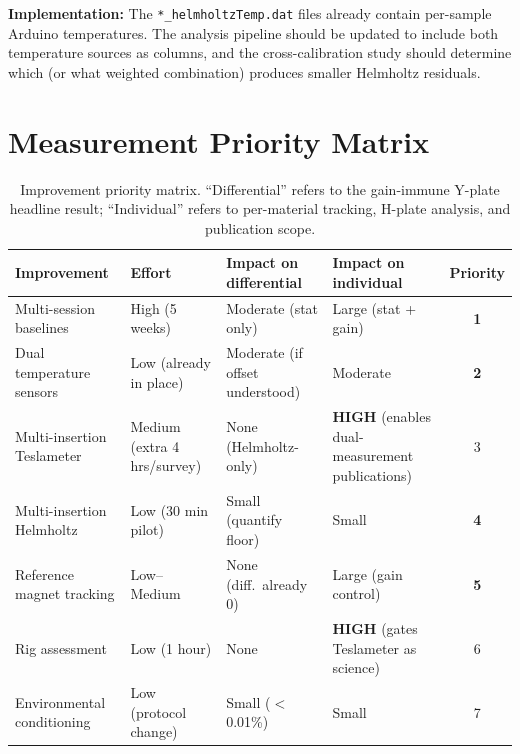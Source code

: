 \documentclass[11pt,letterpaper]{article}
\begin{document}
\textbf{Implementation:} The \texttt{*\_helmholtzTemp.dat} files already contain
per-sample Arduino temperatures. The analysis pipeline should be updated to
include both temperature sources as columns, and the cross-calibration study
should determine which (or what weighted combination) produces smaller Helmholtz
residuals.


\section{Measurement Priority Matrix}
\label{sec:priority-matrix}

\begin{table}[htbp]
\centering
\caption{Improvement priority matrix. ``Differential'' refers to the gain-immune
  Y-plate headline result; ``Individual'' refers to per-material tracking,
  H-plate analysis, and publication scope.}
\label{tab:priority}
\small
\begin{tabular}{@{}p{3.2cm}lp{2.5cm}p{2.5cm}c@{}}
\toprule
Improvement & Effort & Impact on differential & Impact on individual & Priority \\
\midrule
Multi-session baselines      & High (5 weeks)         & Moderate (stat only)      & Large (stat + gain)                                  & \textbf{1} \\
Dual temperature sensors     & Low (already in place)  & Moderate (if offset understood) & Moderate                                      & \textbf{2} \\
Multi-insertion Teslameter   & Medium (extra 4 hrs/survey) & None (Helmholtz-only) & \textbf{HIGH} (enables dual-measurement publications) & 3 \\
Multi-insertion Helmholtz    & Low (30 min pilot)      & Small (quantify floor)    & Small                                                & \textbf{4} \\
Reference magnet tracking    & Low--Medium              & None (diff.\ already 0)  & Large (gain control)                                 & \textbf{5} \\
Rig assessment               & Low (1 hour)            & None                      & \textbf{HIGH} (gates Teslameter as science)           & 6 \\
Environmental conditioning   & Low (protocol change)   & Small ($<$0.01\%)        & Small                                                & 7 \\
\bottomrule
\end{tabular}
\end{table}
\end{document}
